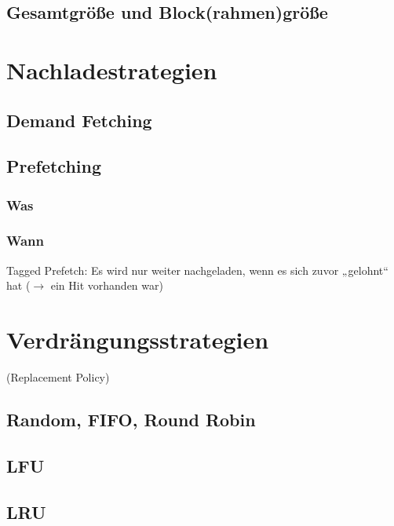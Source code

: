 \subsection{Gesamtgröße und Block(rahmen)größe}

\section{Nachladestrategien}
\subsection{Demand Fetching}
\subsection{Prefetching}
\subsubsection*{Was}
\subsubsection*{Wann}
Tagged Prefetch: Es wird nur weiter nachgeladen, wenn es sich zuvor „gelohnt“ hat ($\to$ ein Hit vorhanden war)

\section{Verdrängungsstrategien}
(Replacement Policy)
\subsection{Random, FIFO, Round Robin}
\subsection{LFU}
\subsection{LRU}

